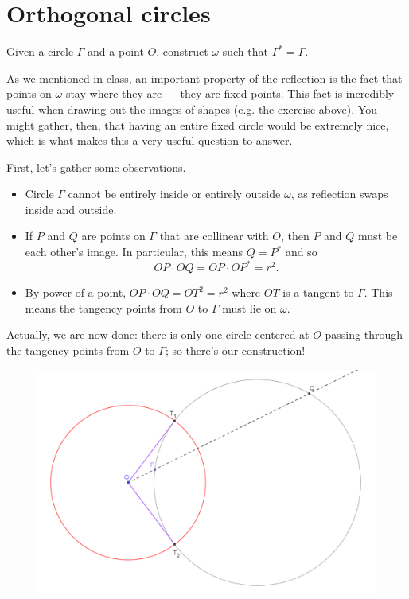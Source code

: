 \documentclass{scrartcl}
\providecommand{\ii}{\item}
\begin{document}
\pagebreak

\section{Orthogonal circles}
\begin{problem}
	Given a circle $\Gamma$ and a point $O$, construct $\omega$
	such that $\Gamma^\ast  = \Gamma$.
\end{problem}

As we mentioned in class, an important property of the reflection is
the fact that points on $\omega$ stay where they are --- they are fixed points.
This fact is incredibly useful when drawing out the images of shapes
(e.g. the exercise above). You might gather, then, that having an entire
fixed circle would be extremely nice, which is what makes this a very
useful question to answer.

First, let's gather some observations.
\begin{itemize}
	\ii Circle $\Gamma$ cannot be entirely inside or entirely outside $\omega$,
	as reflection swaps inside and outside.
	\ii If $P$ and $Q$ are points on $\Gamma$ that are collinear with $O$,
	then $P$ and $Q$ must be each other's image.
	In particular, this means $Q = P^\ast $ and so
	\[OP\cdot OQ = OP\cdot OP^\ast  = r^2.\]
	\ii By power of a point, $OP\cdot OQ = OT^2 = r^2$
	where $OT$ is a tangent to $\Gamma$. This means the tangency points
	from $O$ to $\Gamma$ must lie on $\omega$.
\end{itemize}

Actually, we are now done: there is only one circle centered at $O$
passing through the tangency points from $O$ to $\Gamma$;
so there's our construction!

\begin{figure}[h]
	\centering
	\includegraphics[width=0.7\linewidth]{inversion_orthogonal}
	\label{fig:inversionorthogonal}
\end{figure}
\end{document}
